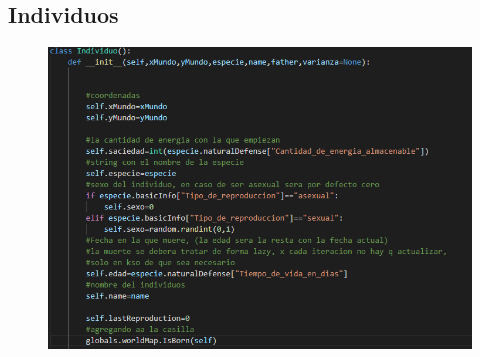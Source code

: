 \documentclass{llncs}
\begin{document}
\subsection{Individuos}
\begin{figure}
	\centering
	\includegraphics[width=0.7\linewidth]{imagenes/Individuo}
	\label{fig:individuo}
\end{figure}
\end{document}
